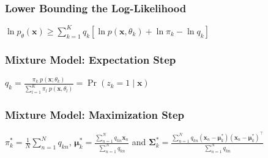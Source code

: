 \documentclass[11pt,a4paper,technote]{IEEEtran}
\newcommand{\matr}[1]{\boldsymbol{\mathbf{#1}}}
\newcommand{\vect}[1]{\boldsymbol{\mathbf{#1}}}
\newcommand{\trns}[1]{#1^{\top}}
\begin{document}
\subsubsection*{Lower Bounding the Log-Likelihood}
      $\ln p_{\theta}(\vect{x})
      \geq \sum_{k=1}^K q_k \left[\ln p(\vect{x},\theta_k)+\ln\pi_k-\ln q_k \right]$

\subsubsection*{Mixture Model: Expectation Step}
\(
  q_k = \frac{\pi_k\; p(\vect{x}; \theta_k)}{\sum_{l=1}^K \pi_l\;p(\vect{x}, \theta_l)}
  = \Pr(z_k = 1 \mid \vect{x})
\)

\subsubsection*{Mixture Model: Maximization Step}
\( \pi_k^* = \frac{1}{N} \sum_{n=1}^N q_{kn} \),
\( \vect{\mu}_k^* = \frac{\sum_{n=1}^N q_{kn}\vect{x}_n}{\sum_{n=1}^N q_{kn}} \)
and
\(
  \matr{\Sigma}_k^* = \frac{\sum_{n=1}^N q_{kn}(\vect{x}_n -
    \vect{\mu}_k^*)\trns{(\vect{x}_n - \vect{\mu}_k^*)}}{\sum_{n=1}^N q_{kn}}
\)
\end{document}
